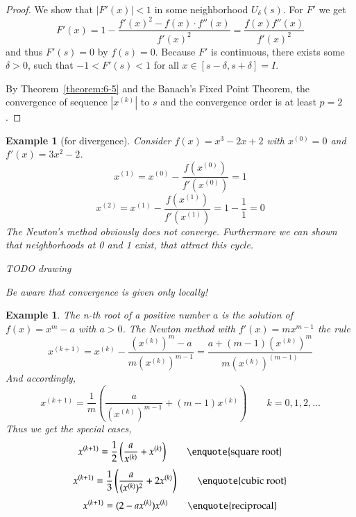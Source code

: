 \documentclass[a4paper]{article}
\newcounter{lecref}[section]
\numberwithin{lecref}{section}
\theoremstyle{break}
\newtheorem{example}[lecref]{Example}
\newcommand{\Abs}[1]{\left|#1\right|}
\begin{document}
\begin{proof}
  We show that $\Abs{F'(x)} < 1$ in some neighborhood $U_\delta(s)$. For $F'$ we get
  \[ F'(x) = 1 - \frac{f'(x)^2 - f(x) \cdot f''(x)}{f'(x)^2} = \frac{f(x) f''(x)}{f'(x)^2} \]
  and thus $F'(s) = 0$ by $f(s) = 0$. Because $F'$ is continuous, there exists some $\delta > 0$,
  such that $-1 < F'(s) < 1$ for all $x \in [s - \delta, s + \delta] = I$.

  By Theorem~\ref{theorem:6-5} and the Banach's Fixed Point Theorem, the convergence of sequence $\Abs{x^{(k)}}$ to $s$ and the convergence order is at least $p = 2$.
\end{proof}

\begin{example}[for divergence]
  Consider $f(x) = x^3 - 2x + 2$ with $x^{(0)} = 0$ and $f'(x) = 3x^2 - 2$.
  \[ x^{(1)} = x^{(0)} - \frac{f(x^{(0)})}{f'(x^{(0)})} = 1 \]
  \[ x^{(2)} = x^{(1)} - \frac{f(x^{(1)})}{f'(x^{(1)})} = 1 - \frac11 = 0 \]
  The Newton's method obviously does not converge.
  Furthermore we can shown that neighborhoods at 0 and 1 exist, that attract this cycle.

  TODO drawing

  Be aware that convergence is given only locally!
\end{example}

\begin{example}
  \label{example:6-8}
  The n-th root of a positive number $a$ is the solution of $f(x) = x^m - a$ with $a > 0$.
  The Newton method with $f'(x) = mx^{m-1}$ the rule
  \[ x^{(k+1)} = x^{(k)} - \frac{(x^{(k)})^m - a}{m(x^{(k)})^{m-1}} = \frac{a + (m - 1) (x^{(k)})^m}{m (x^{(k)})^{(m-1)}} \]
  And accordingly,
  \[ x^{(k + 1)} = \frac1m \left(\frac{a}{(x^{(k)})^{m-1}} + (m-1) x^{(k)}\right) \qquad k = 0, 1, 2, \dots \]
  Thus we get the special cases,
  \[ x^{(k+1)} = \frac12 \left(\frac{a}{x^{(k)}} + x^{(k)}\right) \qquad \text{\enquote{square root}} \]
  \[ x^{(k+1)} = \frac13 \left(\frac{a}{(x^{(k)})^2} + 2x^{(k)}\right) \qquad \text{\enquote{cubic root}} \]
  \[ x^{(k+1)} = (2 - ax^{(k)}) x^{(k)} \qquad \text{\enquote{reciprocal}} \]
\end{example}

\printindex
\end{document}
